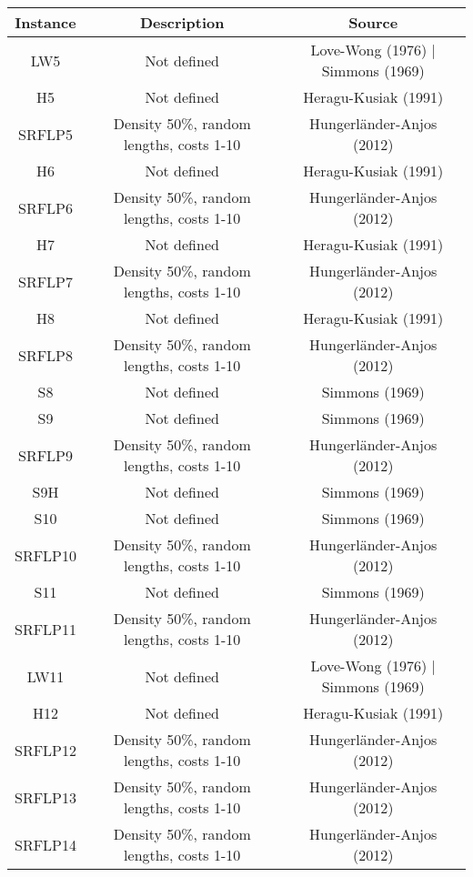\documentclass[a4paper]{article}
\begin{document}
\begin{table}
    \centering
    \begin{tabular}{c|c|c}
        \hline
        Instance & Description & Source \\
        \hline \hline
        LW5 & Not defined & Love-Wong (1976) | Simmons (1969) \\
        H5 & Not defined & Heragu-Kusiak (1991) \\
        SRFLP5 & Density 50\%, random lengths, costs 1-10 & Hungerländer-Anjos (2012) \\
        H6 & Not defined & Heragu-Kusiak (1991) \\
        SRFLP6 & Density 50\%, random lengths, costs 1-10 & Hungerländer-Anjos (2012) \\
        H7 & Not defined & Heragu-Kusiak (1991) \\
        SRFLP7 & Density 50\%, random lengths, costs 1-10 & Hungerländer-Anjos (2012) \\
        H8 & Not defined & Heragu-Kusiak (1991) \\
        SRFLP8 & Density 50\%, random lengths, costs 1-10 & Hungerländer-Anjos (2012) \\
        S8  & Not defined & Simmons (1969) \\
        S9  & Not defined & Simmons (1969) \\
        SRFLP9 & Density 50\%, random lengths, costs 1-10 & Hungerländer-Anjos (2012) \\
        S9H & Not defined & Simmons (1969) \\
        S10 & Not defined & Simmons (1969) \\
        SRFLP10 & Density 50\%, random lengths, costs 1-10 & Hungerländer-Anjos (2012) \\
        S11 & Not defined & Simmons (1969) \\
        SRFLP11 & Density 50\%, random lengths, costs 1-10 & Hungerländer-Anjos (2012) \\
        LW11 & Not defined & Love-Wong (1976) | Simmons (1969) \\
        H12 & Not defined & Heragu-Kusiak (1991) \\
        SRFLP12 & Density 50\%, random lengths, costs 1-10 & Hungerländer-Anjos (2012) \\
        SRFLP13 & Density 50\%, random lengths, costs 1-10 &  Hungerländer-Anjos (2012) \\
        SRFLP14 & Density 50\%, random lengths, costs 1-10 & Hungerländer-Anjos (2012) \\

\end{tabular}
\end{table}
\end{document}
